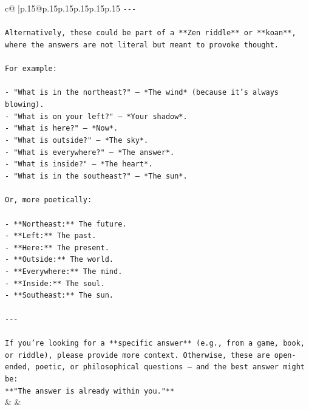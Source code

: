 \documentclass{article}
\begin{document}
{\begin{supertabular}{c@{$\;$}|p{.15\linewidth}@{}p{.15\linewidth}p{.15\linewidth}p{.15\linewidth}p{.15\linewidth}p{.15\linewidth}}
{{{\texttt{{-}{-}{-}} \\
\\ 
\texttt{Alternatively, these could be part of a **Zen riddle** or **koan**, where the answers are not literal but meant to provoke thought.} \\
\\ 
\texttt{For example:} \\
\\ 
\texttt{{-} "What is in the northeast?" — *The wind* (because it's always blowing).} \\
\texttt{{-} "What is on your left?" — *Your shadow*.} \\
\texttt{{-} "What is here?" — *Now*.} \\
\texttt{{-} "What is outside?" — *The sky*.} \\
\texttt{{-} "What is everywhere?" — *The answer*.} \\
\texttt{{-} "What is inside?" — *The heart*.} \\
\texttt{{-} "What is in the southeast?" — *The sun*.} \\
\\ 
\texttt{Or, more poetically:} \\
\\ 
\texttt{{-} **Northeast:** The future.} \\
\texttt{{-} **Left:** The past.} \\
\texttt{{-} **Here:** The present.} \\
\texttt{{-} **Outside:** The world.} \\
\texttt{{-} **Everywhere:** The mind.} \\
\texttt{{-} **Inside:** The soul.} \\
\texttt{{-} **Southeast:** The sun.} \\
\\ 
\texttt{{-}{-}{-}} \\
\\ 
\texttt{If you're looking for a **specific answer** (e.g., from a game, book, or riddle), please provide more context. Otherwise, these are open{-}ended, poetic, or philosophical questions — and the best answer might be:  } \\
\texttt{**"The answer is already within you."**} \\
            }
        }
    }
    & & \\ \\


\end{supertabular}}
\end{document}
